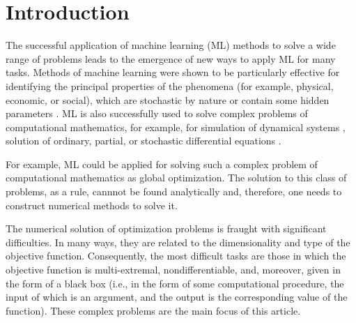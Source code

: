 \documentclass[entropy,article,submit,moreauthors,pdftex]{Definitions/mdpi}
\begin{document}

\section{Introduction}


The successful application of machine learning (ML) methods to solve a wide range of problems leads to the emergence of new ways to apply ML for many tasks. 
Methods of machine learning were shown to be particularly effective for identifying the principal properties of the phenomena (for example, physical, economic, or social), which are stochastic by nature or contain some hidden parameters \cite{Golovenkin2020,Gonoskov2019}.
ML is also successfully used to solve complex problems of computational mathematics, for example, for simulation of dynamical systems  \cite{Seleznev2019}, solution of ordinary, partial, or stochastic differential equations \cite{Lagaris1998,Blechschmidt2021,Xu2020} .

For example, ML could be applied for solving such a complex problem of computational mathematics as global optimization.
The solution to this class of problems, as a rule, cannnot be found analytically and, therefore, one needs to construct numerical methods to solve it.

The numerical solution of optimization problems is fraught with significant difficulties. In many ways, they are related to the dimensionality and type of the objective function. Consequently, the most difficult tasks are those in which the objective function is multi-extremal, nondifferentiable, and, moreover, given in the form of a black box (i.e., in the form of some computational procedure, the input of which is an argument, and the output is the corresponding value of the function). These complex problems are the main focus of this article.
\end{document}

